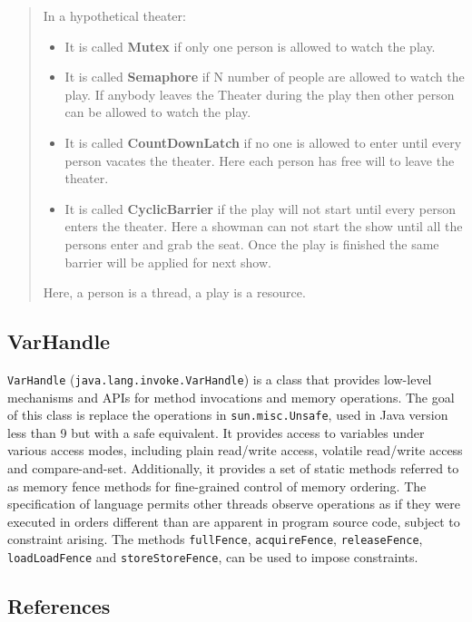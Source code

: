 \documentclass{latex/classes/thesis}
\begin{document}
\begin{quote}
In a hypothetical theater:

\begin{itemize}
\item It is called \textbf{Mutex} if only one person is allowed to watch the play.
\item It is called \textbf{Semaphore} if N number of people are allowed to watch the
play. If anybody leaves the Theater during the play then other person can
be allowed to watch the play.
\item It is called \textbf{CountDownLatch} if no one is allowed to enter until every
person vacates the theater. Here each person has free will to leave the
theater.
\item It is called \textbf{CyclicBarrier} if the play will not start until every person
enters the theater. Here a showman can not start the show until all the
persons enter and grab the seat. Once the play is finished the same barrier
will be applied for next show.
\end{itemize}

Here, a person is a thread, a play is a resource.
\end{quote}

\subsection{VarHandle}
\label{sec:org3296c75}

\texttt{VarHandle} (\texttt{java.lang.invoke.VarHandle}) is a class that provides low-level
mechanisms and APIs for method invocations and memory operations. The goal of
this class is replace the operations in \texttt{sun.misc.Unsafe}, used in Java version
less than 9 but with a safe equivalent. It provides access to variables under
various access modes, including plain read/write access, volatile read/write
access and compare-and-set. Additionally, it provides a set of static methods
referred to as memory fence methods for fine-grained control of memory
ordering. The specification of language permits other threads observe
operations as if they were executed in orders different than are apparent in
program source code, subject to constraint arising. The methods \texttt{fullFence},
\texttt{acquireFence}, \texttt{releaseFence}, \texttt{loadLoadFence} and \texttt{storeStoreFence}, can be used to
impose constraints.


\subsection{References}
\label{sec:orge8efa05}
\end{document}
